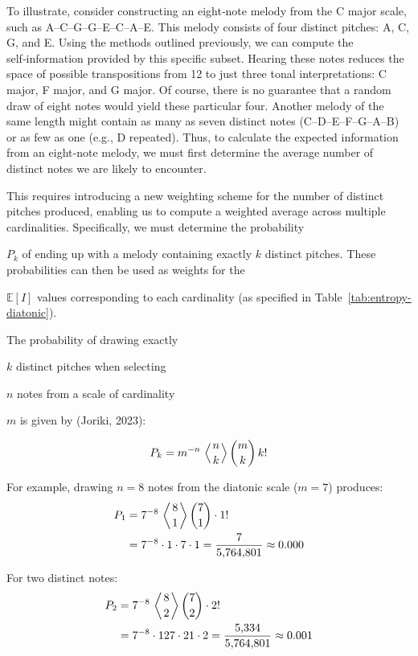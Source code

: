 \documentclass[10pt,twocolumn]{article}
\numberwithin{equation}{section} %
\begin{document}
To illustrate,
consider constructing an eight‑note melody from the C major scale, such as
A–C–G–G–E–C–A–E. This melody consists of four distinct pitches: A, C, G, and E.
Using the methods outlined previously, we can compute the self‑information
provided by this specific subset. Hearing these notes reduces the space of
possible transpositions from 12 to just three tonal interpretations: C major, F
major, and G major. Of course, there is no guarantee that a random draw of
eight notes would yield these particular four. Another melody of the same
length might contain as many as seven distinct notes (C–D–E–F–G–A–B) or as few
as one (e.g., D repeated). Thus, to calculate the expected information from an
eight‑note melody, we must first determine the average number of distinct notes
we are likely to encounter.

This requires
introducing a new weighting scheme for the number of distinct pitches produced,
enabling us to compute a weighted average across multiple cardinalities.
Specifically, we must determine the probability

$P_k$ of
ending up with a melody containing exactly
$k$ distinct pitches. These probabilities can then
be used as weights for the

$\mathbb{E}[I]$ values corresponding to each cardinality (as
specified in Table~\ref{tab:entropy-diatonic}).

The probability
of drawing exactly

$k$ distinct pitches when selecting

$n$ notes from a scale of cardinality

$m$ is given by (Joriki, 2023):

\begin{equation}
P_k = m^{-n} \, \left\langle \genfrac{}{}{0pt}{}{n}{k} \right\rangle \binom{m}{k} \, k!
\label{eq:Pk}
\end{equation}

For example, drawing $n = 8$ notes from the diatonic scale ($m = 7$) produces:
\begin{align*}
P_1 &= 7^{-8} \, \left\langle \genfrac{}{}{0pt}{}{8}{1} \right\rangle \binom{7}{1} \cdot 1! \\
&= 7^{-8} \cdot 1 \cdot 7 \cdot 1
= \frac{7}{5{,}764{,}801} \approx 0.000
\end{align*}

For two distinct notes:
\begin{align*}
P_2 &= 7^{-8} \, \left\langle \genfrac{}{}{0pt}{}{8}{2} \right\rangle \binom{7}{2} \cdot 2! \\
&= 7^{-8} \cdot 127 \cdot 21 \cdot 2
= \frac{5{,}334}{5{,}764{,}801} \approx 0.001
\end{align*}
\end{document}
